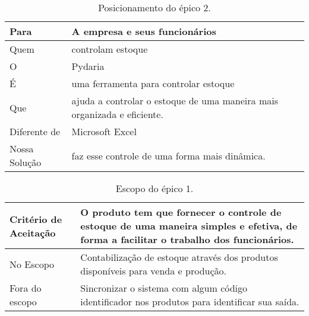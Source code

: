 	\begin{table}[htb]
    \begin{tabular}{|l|l|}
        \hline
        Para          & {\parbox{12cm}{A empresa e seus funcionários}}                                        \\ \hline
        Quem          & {\parbox{12cm}{controlam estoque      }}                                                \\ \hline
        O             & {\parbox{12cm}{Pydaria}}                                                                \\ 
        É             & {\parbox{12cm}{uma ferramenta para controlar estoque         }}                         \\ \hline
        Que           & {\parbox{12cm}{ajuda a controlar o estoque de uma maneira mais organizada e eficiente.  }} \\ \hline
        Diferente de  & {\parbox{12cm}{ Microsoft Excel       }}                                                 \\ \hline
        Nossa Solução & {\parbox{12cm}{faz esse controle de uma forma mais dinâmica.     }}                     \\
        \hline
    \end{tabular}
    \caption{Posicionamento do épico 2.}
    \end{table}

    \begin{table}[htb]
    \begin{tabular}{|l|l|}
        \hline
        Critério de Aceitação & {\parbox{12cm}{O produto tem que fornecer o controle de estoque de uma maneira simples e efetiva, de forma a facilitar o trabalho dos funcionários.}} \\ \hline
        No Escopo             & {\parbox{12cm}{Contabilização de estoque através dos produtos disponíveis para venda e produção. }} \\ \hline
        Fora do escopo        & {\parbox{12cm}{Sincronizar o sistema com algum código identificador nos produtos para identificar sua saída. }}                                       \\
        \hline
    \end{tabular}
    \caption{Escopo do épico 1.}
	\end{table}

\newpage

